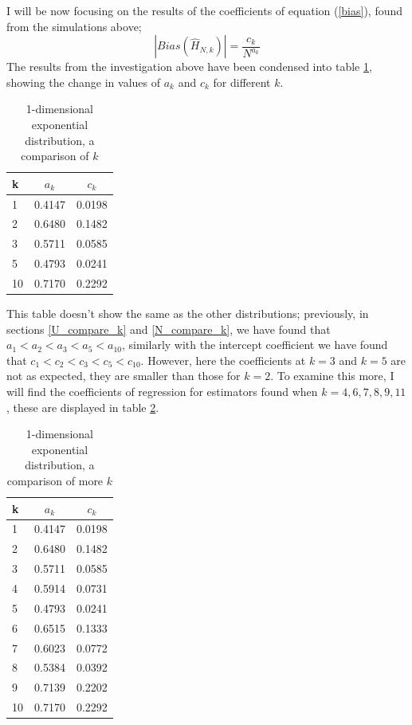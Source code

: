 \documentclass{article}
\begin{document}
I will be now focusing on the results of the coefficients of equation (\ref{bias}), found from the simulations above;
\begin{equation}
|Bias(\hat{H}_{N, k})| = \frac{c_{k}}{N^{a_{k}}} \nonumber
\end{equation}
The results from the investigation above have been condensed into table \ref{expo_k_comparison_table}, showing the change in values of $a_{k}$ and $c_{k}$ for different $k$.

\begin{table}
\caption{1-dimensional exponential distribution, a comparison of $k$} \label{expo_k_comparison_table}
\begin{center}
\begin{tabular}{| l | c c|} 
\toprule
k & $a_{k}$ & $c_{k}$ \\
\midrule[1pt]
1 &  0.4147  &  0.0198  \\
2 &  0.6480  &  0.1482  \\
3 &  0.5711  &  0.0585  \\
5 &  0.4793  &  0.0241  \\
10 & 0.7170 &  0.2292 \\
\hline
\end{tabular}
\end{center}
\end{table}

This table doesn't show the same as the other distributions; previously, in sections \ref{U_compare_k} and \ref{N_compare_k}, we have found that $a_{1} < a_{2} < a_{3} < a_{5} < a_{10}$, similarly with the intercept coefficient we have found that $c_{1} < c_{2} < c_{3} < c_{5} < c_{10}$. However, here the coefficients at $k=3$ and $k=5$ are not as expected, they are smaller than those for $k=2$. To examine this more, I will find the coefficients of regression for estimators found when $k=4,6,7,8,9,11$, these are displayed in table \ref{expo_more_coeffs}.

\begin{table}
\caption{1-dimensional exponential distribution, a comparison of more $k$} \label{expo_more_coeffs}
\begin{center}
\begin{tabular}{| l | c c|} 
\toprule
k & $a_{k}$ & $c_{k}$ \\
\midrule[1pt]
1 &  0.4147  &  0.0198  \\
2 &  0.6480  &  0.1482  \\
3 &  0.5711  &  0.0585  \\
4 &  0.5914  &  0.0731 \\
5 &  0.4793  &  0.0241  \\
6 &  0.6515  &  0.1333  \\
7 &  0.6023  &  0.0772  \\
8 &  0.5384  &  0.0392  \\
9 &  0.7139  &  0.2202  \\
10 & 0.7170 &  0.2292 \\
\hline
\end{tabular}
\end{center}
\end{table}
\end{document}
